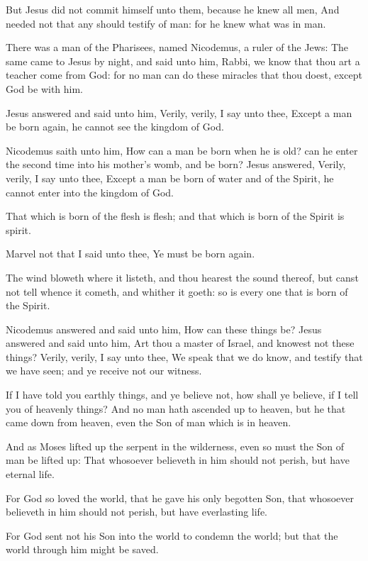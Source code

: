 \Verse But Jesus did not commit himself unto them, because he knew all men, \Verse And needed not that any should testify of man: for he knew what was in man.


\Chapter
\Verse There was a man of the Pharisees, named Nicodemus, a ruler of the Jews: \Verse The same came to Jesus by night, and said unto him, Rabbi, we know that thou art a teacher come from God: for no man can do these miracles that thou doest, except God be with him.

\Verse Jesus answered and said unto him, Verily, verily, I say unto thee, Except a man be born again, he cannot see the kingdom of God.

\Verse Nicodemus saith unto him, How can a man be born when he is old?  can he enter the second time into his mother's womb, and be born?  \Verse Jesus answered, Verily, verily, I say unto thee, Except a man be born of water and of the Spirit, he cannot enter into the kingdom of God.

\Verse That which is born of the flesh is flesh; and that which is born of the Spirit is spirit.

\Verse Marvel not that I said unto thee, Ye must be born again.

\Verse The wind bloweth where it listeth, and thou hearest the sound thereof, but canst not tell whence it cometh, and whither it goeth: so is every one that is born of the Spirit.

\Verse Nicodemus answered and said unto him, How can these things be?  \Verse Jesus answered and said unto him, Art thou a master of Israel, and knowest not these things?  \Verse Verily, verily, I say unto thee, We speak that we do know, and testify that we have seen; and ye receive not our witness.

\Verse If I have told you earthly things, and ye believe not, how shall ye believe, if I tell you of heavenly things?  \Verse And no man hath ascended up to heaven, but he that came down from heaven, even the Son of man which is in heaven.

\Verse And as Moses lifted up the serpent in the wilderness, even so must the Son of man be lifted up: \Verse That whosoever believeth in him should not perish, but have eternal life.

\Verse For God so loved the world, that he gave his only begotten Son, that whosoever believeth in him should not perish, but have everlasting life.

\Verse For God sent not his Son into the world to condemn the world; but that the world through him might be saved.

